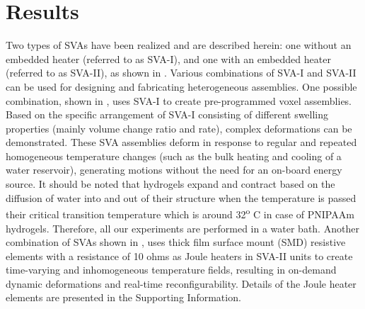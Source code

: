 \section{Results}
Two types of SVAs have been realized and are described herein: one without an embedded heater (referred to as SVA-I), and one with an embedded heater (referred to as SVA-II), as shown in . 
Various combinations of SVA-I and SVA-II can be used for designing and fabricating heterogeneous assemblies. 
One possible combination, shown in , uses SVA-I to create pre-programmed voxel assemblies. Based on the specific arrangement of SVA-I consisting of different swelling properties (mainly volume change ratio and rate), complex deformations can be demonstrated. These SVA assemblies deform in response to regular and repeated homogeneous temperature changes (such as the bulk heating and cooling of a water reservoir), generating motions without the need for an on-board energy source. It should be noted that hydrogels expand and contract based on the diffusion of water into and out of their structure when the temperature is passed their critical transition temperature which is around 32\textsuperscript{o} C in case of PNIPAAm hydrogels. Therefore, all our experiments are performed in a water bath. Another combination of SVAs shown in , uses thick film surface mount (SMD) resistive elements with a resistance of 10 ohms as Joule heaters in SVA-II units to create time-varying and inhomogeneous temperature fields, resulting in on-demand dynamic deformations and real-time reconfigurability. Details of the Joule heater elements are presented in the Supporting Information.\\ 


